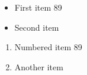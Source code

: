\documentclass{article}
\begin{document}
\begin{itemize}
\item First item 89
\item Second item
\end{itemize}
\begin{enumerate}
\item Numbered item 89
\item Another item
\end{enumerate}
\end{document}
